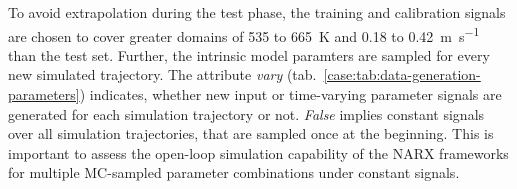 \newline
\newline
\noindent
To avoid extrapolation during the test phase, the training and calibration signals are chosen to cover
greater domains of \SI{535}{} to \SI{665}{\kelvin} and \SI{0.18}{} to \SI{0.42}{\meter \second^{-1}}
than the test set. Further, the intrinsic model paramters are sampled for every new simulated trajectory.
The attribute \emph{vary} (tab.~\ref{case:tab:data-generation-parameters}) indicates, whether 
new input or time-varying parameter signals are generated for each simulation trajectory or not. \emph{False}
implies constant signals over all simulation trajectories, that are sampled once at the beginning.
This is important to assess the open-loop simulation capability of the NARX frameworks
for multiple MC-sampled parameter combinations under constant signals. 
